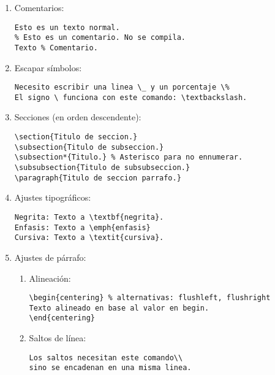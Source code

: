 \begin{enumerate}
\item Comentarios:
\lstset{style=latex}\begin{lstlisting}
Esto es un texto normal.
% Esto es un comentario. No se compila.
Texto % Comentario.
\end{lstlisting}
\item Escapar símbolos:
\begin{lstlisting}
Necesito escribir una linea \_ y un porcentaje \%
El signo \ funciona con este comando: \textbackslash.
\end{lstlisting}
\item Secciones (en orden descendente):
\begin{lstlisting}
\section{Titulo de seccion.}
\subsection{Titulo de subseccion.}
\subsection*{Titulo.} % Asterisco para no ennumerar.
\subsubsection{Titulo de subsubseccion.}
\paragraph{Titulo de seccion parrafo.}
\end{lstlisting}
\item Ajustes tipográficos:
\begin{lstlisting}
Negrita: Texto a \textbf{negrita}.
Enfasis: Texto a \emph{enfasis}
Cursiva: Texto a \textit{cursiva}.
\end{lstlisting}

\item Ajustes de párrafo:
	\begin{enumerate}
	\item Alineación:
	\begin{lstlisting}
\begin{centering} % alternativas: flushleft, flushright
Texto alineado en base al valor en begin.
\end{centering}
	\end{lstlisting}
	\item Saltos de línea:
	\begin{lstlisting}
Los saltos necesitan este comando\\
sino se encadenan en una misma linea.


\end{lstlisting}
\end{enumerate}
\end{enumerate}

